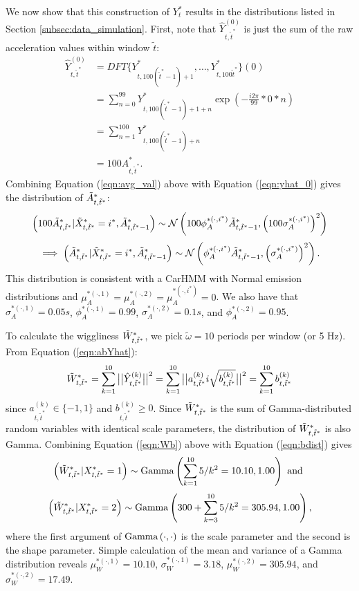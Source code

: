 We now show that this construction of $Y^*_t$ results in the distributions listed in Section \ref{subsec:data_simulation}. First, note that $\hat{Y}^{(0)}_{t,\tilde t^*}$ is just the sum of the raw acceleration values within window $\tilde t$:
%
\begin{align}
    \hat{Y}^{(0)}_{t,\tilde t^*} &=
    DFT\{Y^*_{t,100(\tilde t^* - 1) + 1},\ldots,Y^*_{t,100\tilde t^*}\}(0) \nonumber \\
    &= \sum_{n=0}^{99} Y^*_{t,100(\tilde t^* - 1) + 1 + n} \exp\left(-\frac{i2\pi}{99}*0*n\right) \nonumber \\
    &= \sum_{n=1}^{100} Y^*_{t,100(\tilde t^* - 1) + n} \nonumber \\
    &= 100A^*_{t,\tilde t^*}.
    \label{eqn:avg_val}
\end{align}
%
Combining Equation (\ref{eqn:avg_val}) above with Equation (\ref{eqn:yhat_0}) gives the distribution of $\tilde{A}^*_{t,\tilde t^*}$: 
%
$$\left(100\tilde{A}^*_{t,\tilde t^*} | \tilde X^*_{t,\tilde t^*} = i^*, \tilde{A}^*_{t,\tilde t^*-1} \right) \sim \mathcal{N} \left(100\phi_A^{*(\cdot,i^*)} \tilde{A}^*_{t,\tilde t^*-1}, \left(100\sigma_A^{*(\cdot,i^*)}\right)^2 \right)$$
%
$$\implies \left(\tilde{A}^*_{t,\tilde t^*} | \tilde X^*_{t,\tilde t^*} = i^*, \tilde{A}^*_{t,\tilde t^*-1} \right) \sim \mathcal{N} \left(\phi_A^{*(\cdot,i^*)} \tilde{A}^*_{t,\tilde t^*-1}, \left(\sigma_A^{*(\cdot,i^*)}\right)^2 \right).$$
%
This distribution is consistent with a CarHMM with Normal emission distributions and $\mu_A^{*(\cdot,1)} = \mu_A^{*(\cdot,2)} = \mu_A^{*(\cdot,i^*)} = 0$. We also have that $\sigma_A^{*(\cdot,1)} = 0.05s$, $\phi_A^{*(\cdot,1)} = 0.99$, $\sigma_A^{*(\cdot,2)} = 0.1s$, and $\phi_A^{*(\cdot,2)} = 0.95$.

To calculate the wiggliness $\tilde{W}^*_{t,\tilde t^*}$, we pick $\tilde{\omega} = 10$ periods per window (or 5 Hz). From Equation (\ref{eqn:abYhat}):
%
\begin{equation}
    \Ztwo_{t,\tilde t^*} = \sum_{k=1}^{10} \big|\big|\hat{Y}^{(k)}_{t,\tilde t^*}\big|\big|^2 = \sum_{k=1}^{10} \big|\big|a^{(k)}_{t,\tilde t^*}i\sqrt{b^{(k)}_{t,\tilde t^*}}\big|\big|^2 = \sum_{k=1}^{10} b^{(k)}_{t,\tilde t^*}
    \label{eqn:Wb}
\end{equation}
%
since $a^{(k)}_{t,\tilde t^*} \in \{-1,1\}$ and $b^{(k)}_{t,\tilde t^*} \geq 0$. Since $\tilde{W}^*_{t,\tilde t^*}$ is the sum of Gamma-distributed random variables with identical scale parameters, the distribution of $\tilde{W}^*_{t,\tilde t^*}$ is also Gamma. Combining Equation (\ref{eqn:Wb}) above with Equation (\ref{eqn:bdist}) gives
%
$$\left(\tilde{W}^*_{t,\tilde t^*}|X^*_{t,\tilde t^*} = 1\right) \sim {\rm{Gamma}}\left(\sum_{k=1}^{10} 5/k^2 = 10.10, 1.00 \right) \text { and }$$
%
$$\left(\tilde{W}^*_{t,\tilde t^*}|X^*_{t,\tilde t^*} = 2\right) \sim {\rm{Gamma}}\left(300 + \sum_{k=3}^{10} 5/k^2 = 305.94 , 1.00 \right),$$
%
where the first argument of ${\rm{Gamma}}\left(\cdot,\cdot\right)$ is the scale parameter and the second is the shape parameter. Simple calculation of the mean and variance of a Gamma distribution reveals $\mu_W^{*(\cdot,1)} = 10.10$, $\sigma_W^{*(\cdot,1)} = 3.18$, $\mu_W^{*(\cdot,2)} = 305.94$, and $\sigma_W^{*(\cdot,2)} = 17.49$.


